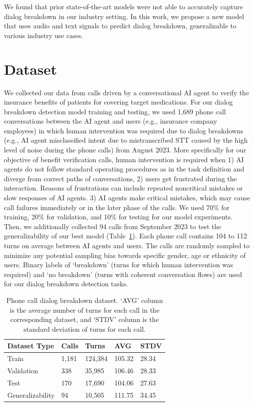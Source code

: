 We found that prior state-of-the-art models were not able to accurately capture dialog breakdown in our industry setting. In this work, we propose a new model that uses audio and text signals to predict dialog breakdown, generalizable to various industry use cases.

\section{Dataset}
We collected our data from calls driven by a conversational AI agent to verify the insurance benefits of patients for covering target medications. For our dialog breakdown detection model training and testing, we used 1,689 phone call conversations between the AI agent and users (e.g., insurance company employees) in which human intervention was required due to dialog breakdowns (e.g., AI agent misclassified intent due to mistranscribed STT caused by the high level of noise during the phone calls) from August 2023. More specifically for our objective of benefit verification calls, human intervention is required when 1) AI agents do not follow standard operating procedures as in the task definition and diverge from correct paths of conversations, 2) users get frustrated during the interaction. Reasons of frustrations can include repeated noncritical mistakes or slow responses of AI agents. 3) AI agents make critical mistakes, which may cause call failures immediately or in the later phase of the calls.  We used 70\% for training, 20\% for validation, and 10\% for testing for our model experiments. Then, we additionally collected 94 calls from September 2023 to test the generalizability of our best model (Table~\ref{tab:dataset}). Each phone call contains 104 to 112 turns on average between AI agents and users. The calls are randomly sampled to minimize any potential sampling bias towards specific gender, age or ethnicity of users. Binary labels of `breakdown' (turns for which human intervention was required) and `no breakdown' (turns with coherent conversation flows) are used for our dialog breakdown detection tasks.

\begin{table}
\small
\centering
\begin{tabular}{l|l|lll}
\hline
\textbf{Dataset Type} & \textbf{Calls} & \textbf{Turns} & \textbf{AVG} & \textbf{STDV}\\
\hline
Train & 1,181 & 124,384  & 105.32  & 28.34 \\ 
Validation & 338 & 35,985  & 106.46 & 28.33 \\ 
Test & 170 & 17,690 & 104.06 & 27.63 \\
Generalizability & 94 & 10,505 & 111.75 & 34.45 \\\hline 
\end{tabular}
\caption{\label{tab:dataset} Phone call dialog breakdown dataset. `AVG' column is the average number of turns for each call in the corresponding dataset, and `STDV' column is the standard deviation of turns for each call.}
\end{table}

